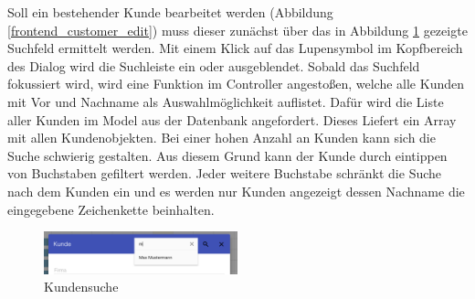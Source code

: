 Soll ein bestehender Kunde bearbeitet werden (Abbildung \ref{frontend_customer_edit}) muss dieser zunächst über das in Abbildung \ref{frontend_customer_search} gezeigte Suchfeld ermittelt werden. Mit einem Klick auf das Lupensymbol im Kopfbereich des Dialog wird die Suchleiste ein oder ausgeblendet. Sobald das Suchfeld fokussiert wird, wird eine Funktion im Controller angestoßen, welche alle Kunden mit Vor und Nachname als Auswahlmöglichkeit auflistet. Dafür wird die Liste aller Kunden im Model aus der Datenbank angefordert. Dieses Liefert ein Array mit allen Kundenobjekten. Bei einer hohen Anzahl an Kunden kann sich die Suche schwierig gestalten. Aus diesem Grund kann der Kunde durch eintippen von Buchstaben gefiltert werden. Jeder weitere Buchstabe schränkt die Suche nach dem Kunden ein und es werden nur Kunden angezeigt dessen Nachname die eingegebene Zeichenkette beinhalten. 

\begin{figure}[H]
\centering\includegraphics[width=0.5\textwidth]{images/frontend_customer_search.png}
\caption{Kundensuche}
\label{frontend_customer_search}
\end{figure}

